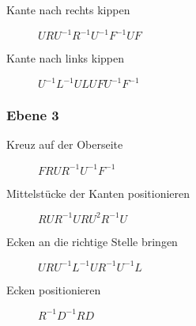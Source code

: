 \documentclass[a4paper,oneside,11pt]{scrartcl}
\begin{document}
\begin{description}
	\item[Kante nach rechts kippen] $URU^{-1}R^{-1}U^{-1}F^{-1}UF$
	\item[Kante nach links kippen] $U^{-1}L^{-1}ULUFU^{-1}F^{-1}$
\end{description}


\subsubsection*{Ebene 3} %
\label{ssub:ebene_3}

\begin{description}
	\item[Kreuz auf der Oberseite] $FRUR^{-1}U^{-1}F^{-1}$
	\item[Mittelstücke der Kanten positionieren] $RUR^{-1}URU^2R^{-1}U$
	\item[Ecken an die richtige Stelle bringen] $URU^{-1}L^{-1}UR^{-1}U^{-1}L$
	\item[Ecken positionieren] $R^{-1}D^{-1}RD$
\end{description}


\end{document}
